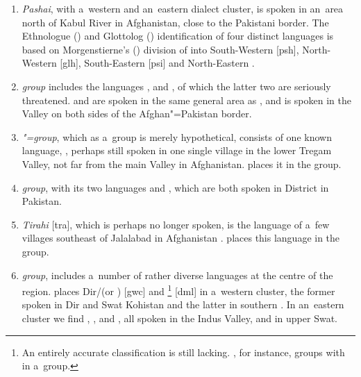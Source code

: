 \begin{enumerate}
\item \textit{Pashai}, with a~western and an~eastern dialect cluster, is spoken in an~area north of Kabul River in Afghanistan, close to the Pakistani border. The Ethnologue (\citeyear{ethnologue2015}) and Glottolog (\citeyear{glottolog2015}) identification of four distinct \iliPashai languages is based on Morgenstierne's (\citeyear{morgenstierne_pashai1973}) division of \iliPashai into South-Western [psh], North-Western [glh], South-Eastern [psi] and North-Eastern \iliPashai [aee].


\item \textit{\iliPech group} includes the languages \iliGawarbati [gwt], \iliGrangali [nli] and \iliShumashti [sts], of which the latter two are seriously threatened. \iliGrangali and \iliShumashti are spoken in the same general area as \iliPashai, and \iliGawarbati is spoken in the \iliKunar Valley on both sides of the Afghan"=Pakistan border. 


\item \textit{\iliPech"=\iliKunar group}, which as a~group is merely hypothetical, consists of one known language, \iliKatarqalai [wsv] \citep{buddruss1960}, perhaps still spoken in one single village in the lower Tregam Valley, not far from the main \iliKunar Valley in Afghanistan. \citet[825]{bashir2003} places it in the \iliKohistani group.


\item \textit{\iliChitral group}, with its two languages \iliKhowar [khw] and \iliKalasha [kls], which are both spoken in \iliChitral District in Pakistan.


\item \textit{Tirahi} [tra], which is perhaps no longer spoken, is the language of a~few villages southeast of Jalalabad in Afghanistan \citep{morgenstierne_tirahi1934}. \citet[824]{bashir2003} places this language in the \iliKohistani group.


\item \textit{\iliKohistani group}, includes a~number of rather diverse languages at the centre of the \iliHKIA region. \citet[258]{strand2001} places Dir/\iliKalamKohistani (or \iliGawri) [gwc] and \iliDameli\footnote{An entirely accurate classification is still lacking. \citet[824]{bashir2003}, for instance, groups \iliDameli with \iliGawarbati in a~\iliKunar group.} [dml] in a~western cluster, the former spoken in Dir and Swat Kohistan and the latter in southern \iliChitral. In an~eastern cluster we find \iliIndusKohistani [mvy], \iliGowro [gwf], \iliChilisso [clh] and \iliBateri [btv], all spoken in the Indus Valley, and \iliTorwali [trw] in upper Swat.



\end{enumerate}
